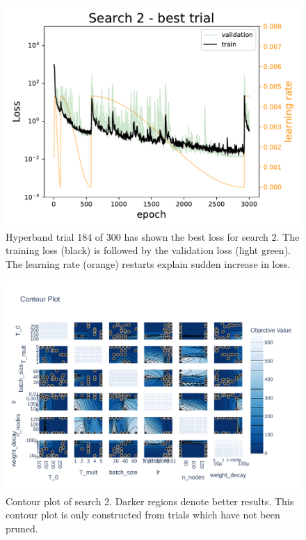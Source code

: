 \begin{figure}
    \centering
    \includegraphics[]{skinstression/images/hyperparameter-search/search-2/best-trial-loss.pdf}
    \caption[Best loss curve of search 2]{
        Hyperband trial 184 of 300 has shown the best loss for search 2.
        The training loss (black) is followed by the validation loss (light green).
        The learning rate (orange) restarts explain sudden increase in loss.
    }
    \label{fig:skinstression-search2-best-loss}
\end{figure}

\begin{figure}
    \includegraphics[angle=90,width=0.9\textheight, height=\linewidth,keepaspectratio]{skinstression/images/hyperparameter-search/search-2/contour.pdf}
    \caption[Search 2 contour plot]{
        Contour plot of search 2.
        Darker regions denote better results.
        This contour plot is only constructed from trials which have not been pruned.
    }
    \label{fig:skinstression-search2-contour}
\end{figure}

